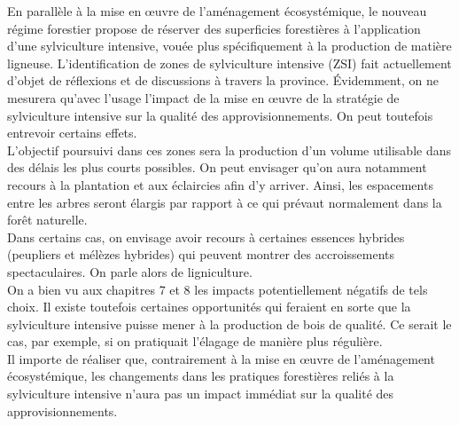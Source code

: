En parallèle à la mise en œuvre de l'aménagement écosystémique, le nouveau régime forestier propose de réserver des superficies forestières à l'application d'une sylviculture intensive, vouée plus spécifiquement à la production de matière ligneuse. L'identification de zones de sylviculture intensive (ZSI) fait actuellement d'objet de réflexions et de discussions à travers la province. Évidemment, on ne mesurera qu'avec l'usage l'impact de la mise en œuvre de la stratégie de sylviculture intensive sur la qualité des approvisionnements. On peut toutefois entrevoir certains effets.\\

L'objectif poursuivi dans ces zones sera la production d'un volume utilisable dans des délais les plus courts possibles. On peut envisager qu'on aura notamment recours à la plantation et aux éclaircies afin d'y arriver. Ainsi, les espacements entre les arbres seront élargis par rapport à ce qui prévaut normalement dans la forêt naturelle.\\

Dans certains cas, on envisage avoir recours à certaines essences hybrides (peupliers et mélèzes hybrides) qui peuvent montrer des accroissements spectaculaires. On parle alors de ligniculture.\\

On a bien vu aux chapitres 7 et 8 les impacts potentiellement négatifs de tels choix. Il existe toutefois certaines opportunités qui feraient en sorte que la sylviculture intensive puisse mener à la production de bois de qualité. Ce serait le cas, par exemple, si on pratiquait l'élagage de manière plus régulière.\\

Il importe de réaliser que, contrairement à la mise en œuvre de l'aménagement écosystémique, les changements dans les pratiques forestières reliés à la sylviculture intensive n'aura pas un impact immédiat sur la qualité des approvisionnements.


